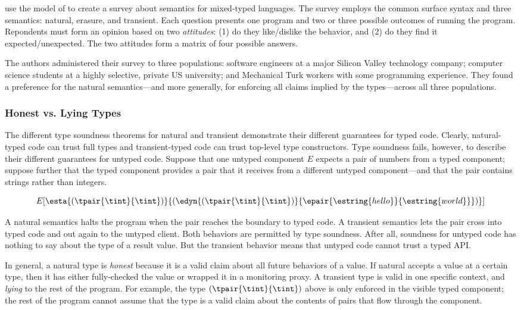 \citet{tgpk-dls-2018} use the model of \citet{gf-icfp-2018} to create a survey about semantics
 for mixed-typed languages.
The survey employs the common surface syntax and three semantics:
 natural, erasure, and transient.
Each question presents one program and two or three possible outcomes of running
 the program.
Repondents must form an opinion based on two \emph{attitudes}:
 (1) do they like/dislike the behavior,
 and (2) do they find it expected/unexpected.
The two attitudes form a matrix of four possible answers.

The authors administered their survey to three populations:
 software engineers at a major Silicon Valley technology company;
 computer science students at a highly selective, private US university;
 and Mechanical Turk workers with some programming experience.
They found a preference for the natural semantics---and more generally,
 for enforcing all claims implied by the types---across all three populations.


\subsubsection{Honest vs. Lying Types}

The different type soundness theorems for natural and transient
 demonstrate their different guarantees for typed code.
Clearly, natural-typed code can trust full types and transient-typed code
 can trust top-level type constructors.
Type soundness fails, however, to describe their different guarantees for
 untyped code.
Suppose that one untyped component $E$ expects a pair of numbers from a
 typed component;
 suppose further that the typed component provides a pair that it receives
 from a different untyped component---and that the pair contains strings
 rather than integers.

\[
  E[\esta{(\tpair{\tint}{\tint})}{(\edyn{(\tpair{\tint}{\tint})}{\epair{\estring{hello}}{\estring{world}}})}]
\]

\noindent
A natural semantics halts the program when the pair reaches the boundary to
 typed code.
A transient semantics lets the pair cross into typed code and out again to the
 untyped client.
Both behaviors are permitted by type soundness.
After all, soundness for untyped code has nothing to say about the type of a
 result value.
But the transient behavior means that untyped code cannot trust a typed
 API.

In general, a natural type is \emph{honest}\/ because it is a valid
 claim about all future behaviors of a value.
If natural accepts a value at a certain type, then it has either fully-checked
 the value or wrapped it in a monitoring proxy.
A transient type is valid in one specific context, and \emph{lying}\/
 to the rest of the program.
For example, the type $(\tpair{\tint}{\tint})$ above is only enforced in
 the visible typed component; the rest of the program cannot assume that the
 type is a valid claim about the contents of pairs that flow through the component.

